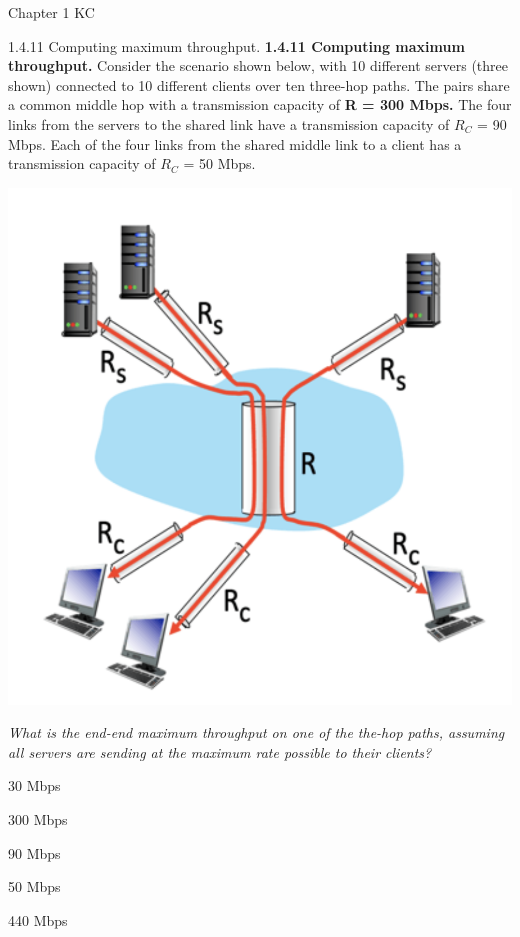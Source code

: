 \documentclass[a4paper]{article}
\begin{document}
\begin{quiz}{Chapter 1 KC}
\begin{multi}[points=1]{1.4.11 Computing maximum throughput.}
\textbf{1.4.11 Computing maximum throughput.} 
Consider the scenario shown below, with 10 different servers (three shown) connected to 10 different clients over ten three-hop paths. The pairs share a common middle hop with a transmission capacity of \textbf{R = 300 Mbps.} The four links from the servers to the shared link have a transmission capacity of $R_C$ = 90 Mbps. Each of the four links from the shared middle link to a client has a transmission capacity of $R_C$ = 50 Mbps.
\begin{center}
\includegraphics[width=\linewidth]{figs/1.4.11.png}
\end{center}

\emph{What is the end-end maximum throughput on one of the the-hop paths, assuming all servers are sending at the maximum rate possible to their clients?}
\item* 30 Mbps
\item 300 Mbps
\item 90 Mbps
\item 50 Mbps
\item 440 Mbps
\end{multi}


\end{quiz}
\end{document}
